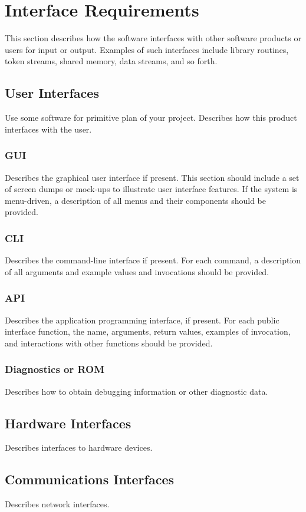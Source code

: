 \documentclass[12pt]{article}
\begin{document}
\section{Interface Requirements}
This section describes how the software interfaces with other software products or users for input or output. Examples of such interfaces include library routines, token streams, shared memory, data streams, and so forth. 
\subsection{User Interfaces}
Use some software for primitive plan of your project.
Describes how this product interfaces with the user. 
\subsubsection {GUI}
Describes the graphical user interface if present. This section should include a set of screen dumps or mock-ups to illustrate user interface features. 
If the system is menu-driven, a description of all menus and their components should be provided. 
\subsubsection { CLI}
Describes the command-line interface if present. For each command, a description of all arguments and example values and invocations should be provided. 
\subsubsection {API}
Describes the application programming interface, if present. For each public interface function, the name, arguments, return values, examples of invocation, and interactions with other functions should be provided. 
\subsubsection {Diagnostics or ROM}
Describes how to obtain debugging information or other diagnostic data. 

\subsection{Hardware Interfaces}
Describes interfaces to hardware devices.
\subsection{Communications Interfaces}
Describes network interfaces. 
\end{document}
